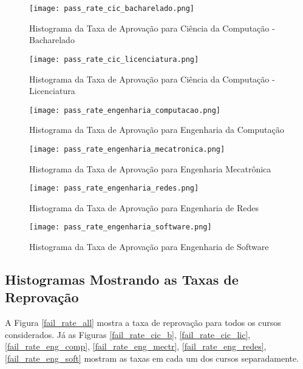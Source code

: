 \begin{figure}[!ht]
    \caption{Histograma da Taxa de Aprovação para Ciência da Computação - Bacharelado}
    \centering
    \texttt{[image: pass\_rate\_cic\_bacharelado.png]}
    \label{pass_rate_cic_b}
\end{figure}

\begin{figure}[!ht]
    \caption{Histograma da Taxa de Aprovação para Ciência da Computação -
    Licenciatura}
    \centering
    \texttt{[image: pass\_rate\_cic\_licenciatura.png]}
    \label{pass_rate_cic_lic}
\end{figure}

\begin{figure}[!ht]
    \caption{Histograma da Taxa de Aprovação para Engenharia da Computação}
    \centering
    \texttt{[image: pass\_rate\_engenharia\_computacao.png]}
    \label{pass_rate_eng_comp}
\end{figure}

\begin{figure}[!ht]
    \caption{Histograma da Taxa de Aprovação para Engenharia Mecatrônica}
    \centering
    \texttt{[image: pass\_rate\_engenharia\_mecatronica.png]}
    \label{pass_rate_eng_mectr}
\end{figure}

\begin{figure}[!ht]
    \caption{Histograma da Taxa de Aprovação para Engenharia de Redes}
    \centering
    \texttt{[image: pass\_rate\_engenharia\_redes.png]}
    \label{pass_rate_eng_redes}
\end{figure}

\begin{figure}[!ht]
    \caption{Histograma da Taxa de Aprovação para Engenharia de Software}
    \centering
    \texttt{[image: pass\_rate\_engenharia\_software.png]}
    \label{pass_rate_eng_soft}
\end{figure}

\clearpage

\subsection{Histogramas Mostrando as Taxas de Reprovação}
A Figura \ref{fail_rate_all} mostra a taxa de reprovação para todos os cursos
considerados. 
Já as Figuras \ref{fail_rate_cic_b}, \ref{fail_rate_cic_lic},
\ref{fail_rate_eng_comp}, \ref{fail_rate_eng_mectr}, \ref{fail_rate_eng_redes},
\ref{fail_rate_eng_soft} mostram as taxas em cada um dos cursos separadamente. 


